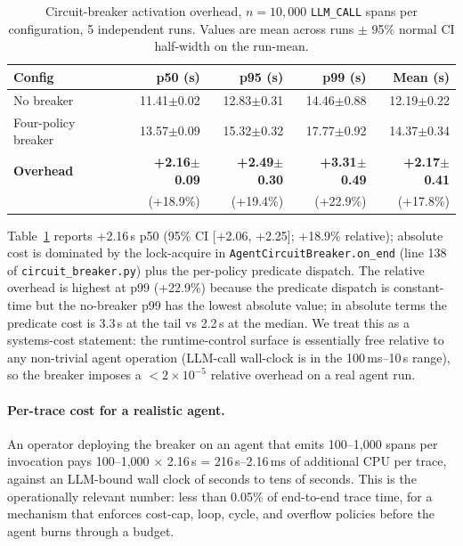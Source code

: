 \documentclass[sigplan,10pt,anonymous,review]{acmart}
\begin{document}
\begin{table}[t]
\centering
\small
\caption{Circuit-breaker activation overhead, $n=10{,}000$
\texttt{LLM\_CALL} spans per configuration, 5 independent runs.
Values are mean across runs $\pm$ 95\% normal CI half-width on the
run-mean.}
\label{tab:cb}
\begin{tabular}{@{}lrrrr@{}}
\toprule
\textbf{Config} & \textbf{p50 (\textmu{}s)} & \textbf{p95 (\textmu{}s)} & \textbf{p99 (\textmu{}s)} & \textbf{Mean (\textmu{}s)} \\
\midrule
No breaker          & 11.41$\pm$0.02 & 12.83$\pm$0.31 & 14.46$\pm$0.88 & 12.19$\pm$0.22 \\
Four-policy breaker & 13.57$\pm$0.09 & 15.32$\pm$0.32 & 17.77$\pm$0.92 & 14.37$\pm$0.34 \\
\midrule
\textbf{Overhead}   & \textbf{+2.16$\pm$0.09} & \textbf{+2.49$\pm$0.30} & \textbf{+3.31$\pm$0.49} & \textbf{+2.17$\pm$0.41} \\
                    & \scriptsize{(+18.9\%)} & \scriptsize{(+19.4\%)} & \scriptsize{(+22.9\%)} & \scriptsize{(+17.8\%)} \\
\bottomrule
\end{tabular}
\end{table}

Table~\ref{tab:cb} reports +2.16\,\textmu{}s p50 (95\% CI [+2.06,
+2.25]; +18.9\% relative); absolute cost is dominated by the
lock-acquire in \texttt{AgentCircuitBreaker.on\_end} (line 138 of
\texttt{circuit\_breaker.py}) plus the per-policy predicate dispatch.
The relative overhead is highest at p99 (+22.9\%) because the
predicate dispatch is constant-time but the no-breaker p99 has the
lowest absolute value; in absolute terms the predicate cost is
3.3\,\textmu{}s at the tail vs 2.2\,\textmu{}s at the median. We
treat this as a systems-cost statement: the runtime-control surface
is essentially free relative to any non-trivial agent operation
(LLM-call wall-clock is in the 100\,ms--10\,s range), so the breaker
imposes a $<2\times10^{-5}$ relative overhead on a real agent run.

\paragraph{Per-trace cost for a realistic agent.} An operator deploying
the breaker on an agent that emits 100--1{,}000 spans per invocation
pays 100--1{,}000 $\times$ 2.16\,\textmu{}s = 216\,\textmu{}s--2.16\,ms
of additional CPU per trace, against an LLM-bound wall clock of seconds
to tens of seconds. This is the operationally relevant number: less
than 0.05\% of end-to-end trace time, for a mechanism that enforces
cost-cap, loop, cycle, and overflow policies before the agent burns
through a budget.
\end{document}

